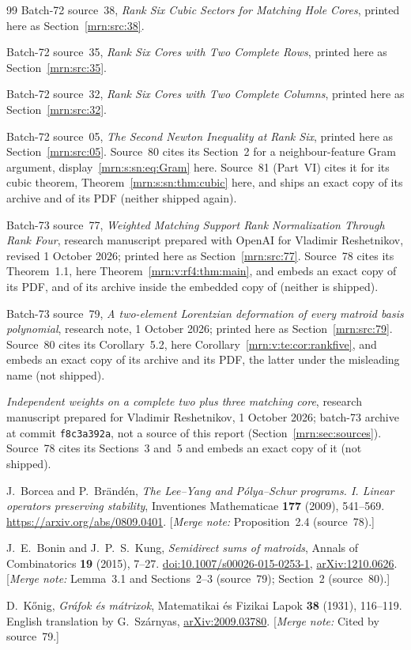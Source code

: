 \documentclass[11pt,a4paper]{article}
\theoremstyle{remark}\newtheorem{remark}[theorem]{Remark}
\newcommand{\mnote}[1]{[\textit{Merge note:} #1]}
\begin{document}
\begin{thebibliography}{99}
Batch-72 source~38, \emph{Rank Six Cubic Sectors for Matching Hole Cores},
printed here as Section~\ref{mrn:src:38}.

Batch-72 source~35, \emph{Rank Six Cores with Two Complete Rows}, printed
here as Section~\ref{mrn:src:35}.

Batch-72 source~32, \emph{Rank Six Cores with Two Complete Columns}, printed
here as Section~\ref{mrn:src:32}.

Batch-72 source~05, \emph{The Second Newton Inequality at Rank Six}, printed
here as Section~\ref{mrn:src:05}. Source~80 cites its Section~2 for a
neighbour-feature Gram argument, display~\eqref{mrn:s:sn:eq:Gram} here.
Source~81 (Part~VI) cites it for its cubic theorem,
Theorem~\ref{mrn:s:sn:thm:cubic} here, and ships an exact copy of its archive
and of its PDF (neither shipped again).

Batch-73 source~77, \emph{Weighted Matching Support Rank Normalization Through
Rank Four}, research manuscript prepared with OpenAI for Vladimir Reshetnikov,
revised 1 October 2026; printed here as Section~\ref{mrn:src:77}. Source~78
cites its Theorem~1.1, here Theorem~\ref{mrn:v:rf4:thm:main}, and embeds an
exact copy of its PDF, and of its archive inside the embedded copy of
 (neither is shipped).

Batch-73 source~79, \emph{A two-element Lorentzian deformation of every
matroid basis polynomial}, research note, 1 October 2026; printed here as
Section~\ref{mrn:src:79}. Source~80 cites its Corollary~5.2, here
Corollary~\ref{mrn:v:te:cor:rankfive}, and embeds an exact copy of its
archive and its PDF, the latter under the misleading name
 (not shipped).

\emph{Independent weights on a complete two plus three matching core}, research
manuscript prepared for Vladimir Reshetnikov, 1 October 2026; batch-73 archive
 at commit \texttt{f8c3a392a}, not a
source of this report (Section~\ref{mrn:sec:sources}). Source~78 cites its
Sections~3 and~5 and embeds an exact copy of it (not shipped).

J.~Borcea and P.~Br\"and\'en, \emph{The Lee--Yang and P\'olya--Schur
programs. I. Linear operators preserving stability}, Inventiones Mathematicae
\textbf{177} (2009), 541--569.
\url{https://arxiv.org/abs/0809.0401}.
\mnote{Proposition~2.4 (source~78).}

J.~E.~Bonin and J.~P.~S.~Kung, \emph{Semidirect sums of matroids}, Annals of
Combinatorics \textbf{19} (2015), 7--27.
\href{https://doi.org/10.1007/s00026-015-0253-1}{doi:10.1007/s00026-015-0253-1},
\href{https://arxiv.org/abs/1210.0626}{arXiv:1210.0626}.
\mnote{Lemma~3.1 and Sections~2--3 (source~79); Section~2 (source~80).}

D.~K\H{o}nig, \emph{Gr\'afok \'es m\'atrixok}, Matematikai \'es Fizikai Lapok
\textbf{38} (1931), 116--119. English translation by G.~Sz\'arnyas,
\href{https://arxiv.org/abs/2009.03780}{arXiv:2009.03780}.
\mnote{Cited by source~79.}
\end{thebibliography}
\end{document}
